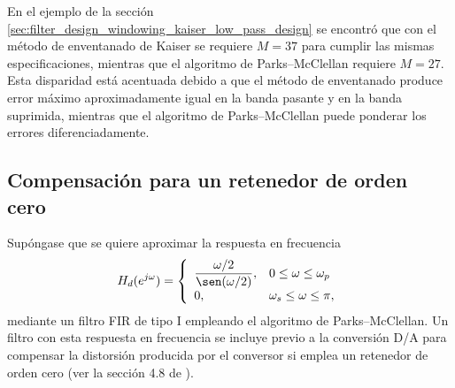 \documentclass[a4paper]{report}
\begin{document}
En el ejemplo de la sección \ref{sec:filter_design_windowing_kaiser_low_pass_design} se encontró que con el método de enventanado de Kaiser se requiere \(M=37\) para cumplir las mismas especificaciones, mientras que el algoritmo de Parks--McClellan requiere \(M=27\). Esta disparidad está acentuada debido a que el método de enventanado produce error máximo aproximadamente igual en la banda pasante y en la banda suprimida, mientras que el algoritmo de Parks--McClellan puede ponderar los errores diferenciadamente.

\subsection{Compensación para un retenedor de orden cero}

Supóngase que se quiere aproximar la respuesta en frecuencia
\[
 H_d(e^{j\omega})=
 \left\{ 
 \begin{array}{ll}
  \dfrac{\omega/2}{\sen(\omega/2)},& 0\leq\omega\leq\omega_p\\[\medskipamount]
  0,& \omega_s\leq\omega\leq\pi,
 \end{array}
 \right.
\]
mediante un filtro FIR de tipo I empleando el algoritmo de Parks--McClellan. Un filtro con esta respuesta en frecuencia se incluye previo a la conversión D/A para compensar la distorsión producida por el conversor si emplea un retenedor de orden cero (ver la sección 4.8 de \cite{oppenheim2009discrete}).
\end{document}
